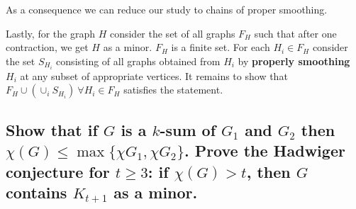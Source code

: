 As a consequence we can reduce our study to chains of proper smoothing.

Lastly, for the graph $H$ consider the set of all graphs $F_H$ such that after one contraction, we get $H$ as a minor.
$F_H$ is a finite set.
For each $H_i \in F_H$ consider the set $S_{H_i}$ consisting of all graphs obtained from $H_i$ by \textbf{properly smoothing} $H_i$ at any subset of appropriate vertices.
It remains to show that $F_H \cup (\cup_i S_{H_i}) \: \forall H_i \in F_H$ satisfies the statement.

\subsection[Minors 1 - 6]{Show that if $G$ is a $k$-sum of $G_1$ and $G_2$ then $\chi(G) \leq \max\{\chi{G_1}, \chi{G_2}\}$. Prove the Hadwiger conjecture for $t \geq 3$: if $\chi(G) > t$, then $G$ contains $K_{t+1}$ as a minor.}
